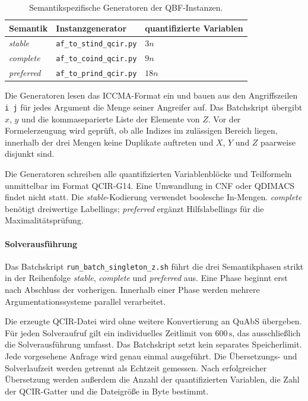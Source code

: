 \begin{table}[htbp]
    \centering
    \begin{tabular}{@{}lll@{}}
        \toprule
        Semantik & Instanzgenerator & quantifizierte Variablen \\
        \midrule
        \emph{stable} & \texttt{af\_to\_stind\_qcir.py} & \(3n\) \\
        \emph{complete} & \texttt{af\_to\_coind\_qcir.py} & \(9n\) \\
        \emph{preferred} & \texttt{af\_to\_prind\_qcir.py} & \(18n\) \\
        \bottomrule
    \end{tabular}
    \caption{Semantikspezifische Generatoren der QBF-Instanzen.}
    \label{tab:experimental-qbf-generators}
\end{table}
Die Generatoren lesen das ICCMA-Format ein und bauen aus den
Angriffszeilen \texttt{i j} für jedes Argument die Menge seiner Angreifer
auf. Das Batchskript übergibt \(x\), \(y\) und die kommaseparierte Liste
der Elemente von \(Z\). Vor der Formelerzeugung wird geprüft,
ob alle Indizes im zulässigen Bereich liegen, innerhalb der drei Mengen
keine Duplikate auftreten und \(X\), \(Y\) und \(Z\) paarweise disjunkt
sind.

Die Generatoren schreiben alle quantifizierten Variablenblöcke und
Teilformeln unmittelbar im Format QCIR-G14. Eine Umwandlung in CNF oder
QDIMACS findet nicht statt. Die \emph{stable}-Kodierung verwendet boolesche
In-Mengen. \emph{complete} benötigt dreiwertige Labellings; \emph{preferred} ergänzt
Hilfslabellings für die Maximalitätsprüfung.

\paragraph{Solverausführung}
\label{subsec:solver-execution-protocol}

Das Batchskript \texttt{run\_batch\_singleton\_z.sh} führt die drei
Semantikphasen strikt in der Reihenfolge \emph{stable}, \emph{complete} und \emph{preferred}
aus. Eine Phase beginnt erst nach Abschluss der vorherigen. Innerhalb einer
Phase werden mehrere Argumentationssysteme parallel verarbeitet.

Die erzeugte QCIR-Datei wird ohne weitere Konvertierung an QuAbS
übergeben. Für jeden Solveraufruf gilt ein individuelles Zeitlimit von
\(600\,\mathrm{s}\), das ausschließlich die Solverausführung umfasst. Das
Batchskript setzt kein separates Speicherlimit. Jede vorgesehene Anfrage
wird genau einmal ausgeführt. Die Übersetzungs- und Solverlaufzeit werden
getrennt als Echtzeit gemessen. Nach erfolgreicher Übersetzung
werden außerdem die Anzahl der quantifizierten Variablen, die Zahl der
QCIR-Gatter und die Dateigröße in Byte bestimmt.

